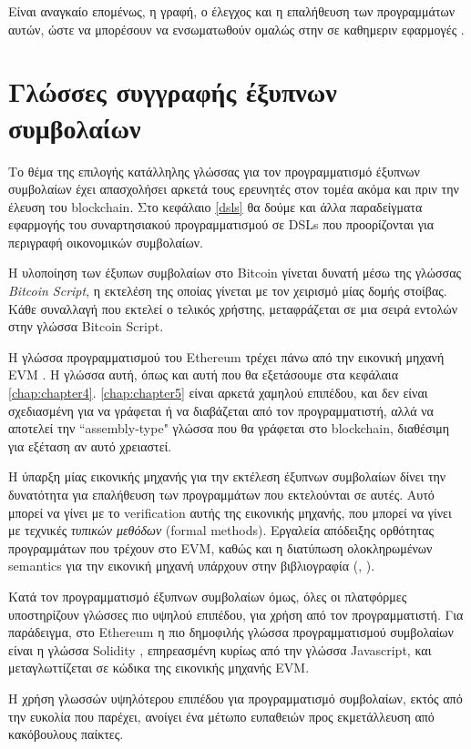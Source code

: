 Είναι αναγκαίο επομένως, η γραφή, ο έλεγχος και η επαλήθευση των προγραμμάτων
αυτών, ώστε να μπορέσουν να ενσωματωθούν ομαλώς στην σε καθημεριν εφαρμογές .


\section{Γλώσσες συγγραφής έξυπνων συμβολαίων}

Το θέμα της επιλογής κατάλληλης γλώσσας για τον προγραμματισμό έξυπνων
συμβολαίων έχει  απασχολήσει αρκετά τους ερευνητές στον τομέα ακόμα και πριν
την έλευση του blockchain. Στο κεφάλαιο \ref{dsls} θα δούμε και άλλα
παραδείγματα εφαρμογής του συναρτησιακού προγραμματισμού σε DSLs που
προορίζονται για περιγραφή οικονομικών συμβολαίων.

Η υλοποίηση των έξυπων συμβολαίων στο Bitcoin γίνεται δυνατή μέσω
της γλώσσας \textit{Bitcoin Script}, η εκτελέση της οποίας
γίνεται με τον χειρισμό μίας δομής στοίβας. Κάθε συναλλαγή που
εκτελεί ο τελικός χρήστης, μεταφράζεται σε μια σειρά εντολών στην
γλώσσα Bitcoin Script.

Η γλώσσα προγραμματισμού του Ethereum τρέχει πάνω από την εικονική μηχανή  EVM
\cite{ethereum}. Η γλώσσα αυτή, όπως και αυτή που θα εξετάσουμε στα κεφάλαια
\ref{chap:chapter4}. \ref{chap:chapter5} είναι αρκετά χαμηλού επιπέδου, και δεν
είναι σχεδιασμένη για να γράφεται ή να διαβάζεται από τον προγραμματιστή, αλλά
να αποτελεί την ``assembly-type" γλώσσα που θα γράφεται στο blockchain,
διαθέσιμη για εξέταση αν αυτό χρειαστεί.

Η ύπαρξη μίας εικονικής μηχανής για την εκτέλεση έξυπνων συμβολαίων δίνει την
δυνατότητα για επαλήθευση των προγραμμάτων που εκτελούνται σε αυτές. Αυτό
μπορεί να γίνει με το verification αυτής της εικονικής μηχανής, που μπορεί να
γίνει με τεχνικές \emph{τυπικών μεθόδων} (formal methods). Εργαλεία απόδειξης
ορθότητας προγραμμάτων που τρέχουν στο EVM, καθώς και η διατύπωση ολοκληρωμένων
semantics για την εικονική μηχανή υπάρχουν στην βιβλιογραφία
(\cite{evmverification}, \cite{kevmverification}).

Κατά τον προγραμματισμό έξυπνων συμβολαίων όμως, όλες οι πλατφόρμες
υποστηρίζουν γλώσσες πιο υψηλού επιπέδου, για χρήση από τον προγραμματιστή. Για
παράδειγμα, στο Ethereum η πιο δημοφιλής γλώσσα προγραμματισμού συμβολαίων
είναι η γλώσσα Solidity \cite{solidity}, επηρεασμένη κυρίως από την γλώσσα
Javascript, και μεταγλωττίζεται σε κώδικα της εικονικής μηχανής EVM.

Η χρήση γλωσσών υψηλότερου επιπέδου για προγραμματισμό συμβολαίων, εκτός από
την ευκολία που παρέχει, ανοίγει ένα μέτωπο ευπαθειών προς εκμετάλλευση από
κακόβουλους παίκτες.


